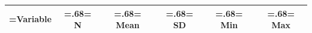 \begin{tabularx}{\linewidth}{@{}>{\hsize\linewidth=\hsize}Y >{\hsize=.68\hsize\linewidth=\hsize}C >{\hsize=.68\hsize\linewidth=\hsize}C >{\hsize=.68\hsize\linewidth=\hsize}C >{\hsize=.68\hsize\linewidth=\hsize}C >{\hsize=.68\hsize\linewidth=\hsize}C @{}}
\toprule
\textbf{Variable} & \textbf{N} & \textbf{Mean} & \textbf{SD} & \textbf{Min} & \textbf{Max}\\
\midrule
\bottomrule
\end{tabularx}
